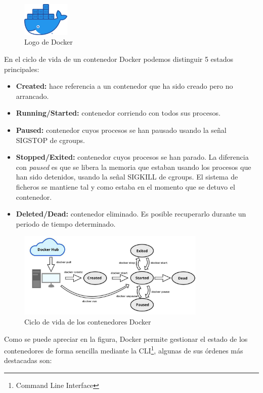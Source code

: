 	\begin{figure}[h]
	\centering
	\includegraphics[width=0.2\textwidth]{../imgs/EdA/docker.png}
	\caption{Logo de Docker}
	\label{fig:docker-logo}
	\end{figure}

	En el ciclo de vida de un contenedor Docker podemos distinguir 5 estados principales:

	\begin{itemize}
		\item \textbf{Created:} hace referencia a un contenedor que ha sido creado pero no arrancado.
		\item \textbf{Running/Started:} contenedor corriendo con todos sus procesos.
		\item \textbf{Paused:} contenedor cuyos procesos se han pausado usando la señal SIGSTOP de cgroups.
		\item \textbf{Stopped/Exited:} contenedor cuyos procesos se han parado. La diferencia con \textit{paused} es que se libera la memoria que estaban usando los procesos que han sido detenidos, usando la señal SIGKILL de cgroups. El sistema de ficheros se mantiene tal y como estaba en el momento que se detuvo el contenedor.
		\item \textbf{Deleted/Dead:} contenedor eliminado. Es posible recuperarlo durante un periodo de tiempo determinado.
	\end{itemize}

	\begin{figure}[h]
	\centering
	\includegraphics[width=0.8\textwidth]{../imgs/EdA/docker-life.jpeg}
	\caption{Ciclo de vida de los contenedores Docker}
	\label{fig:docker-life}
	\end{figure}

	Como se puede apreciar en la figura, Docker permite gestionar el estado de los contenedores de forma sencilla mediante la CLI\footnote{Command Line Interface}, algunas de sus órdenes más destacadas son:

